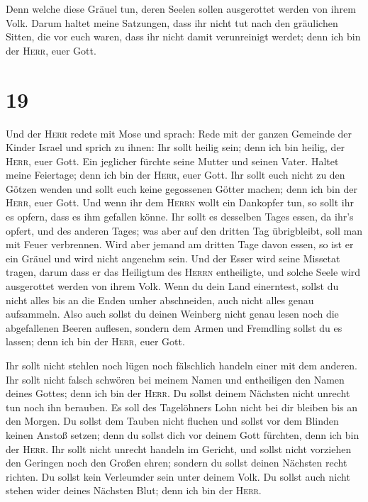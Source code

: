  Denn welche diese Gräuel tun, deren Seelen sollen
ausgerottet werden von ihrem Volk.  Darum haltet meine
Satzungen, dass ihr nicht tut nach den gräulichen Sitten, die vor euch
waren, dass ihr nicht damit verunreinigt werdet; denn ich bin der
\textsc{Herr}, euer Gott.

\hypertarget{section-18}{%
\section{19}\label{section-18}}

 Und der \textsc{Herr} redete mit Mose und sprach:
 Rede mit der ganzen Gemeinde der Kinder Israel und sprich
zu ihnen: Ihr sollt heilig sein; denn ich bin heilig, der \textsc{Herr},
euer Gott.  Ein jeglicher fürchte seine Mutter und seinen
Vater. Haltet meine Feiertage; denn ich bin der \textsc{Herr}, euer
Gott.  Ihr sollt euch nicht zu den Götzen wenden und sollt
euch keine gegossenen Götter machen; denn ich bin der \textsc{Herr},
euer Gott.  Und wenn ihr dem \textsc{Herrn} wollt ein
Dankopfer tun, so sollt ihr es opfern, dass es ihm gefallen könne.
 Ihr sollt es desselben Tages essen, da ihr's opfert, und
des anderen Tages; was aber auf den dritten Tag übrigbleibt, soll man
mit Feuer verbrennen.  Wird aber jemand am dritten Tage
davon essen, so ist er ein Gräuel und wird nicht angenehm sein.
 Und der Esser wird seine Missetat tragen, darum dass er
das Heiligtum des \textsc{Herrn} entheiligte, und solche Seele wird
ausgerottet werden von ihrem Volk.  Wenn du dein Land
einerntest, sollst du nicht alles bis an die Enden umher abschneiden,
auch nicht alles genau aufsammeln.  Also auch sollst du
deinen Weinberg nicht genau lesen noch die abgefallenen Beeren auflesen,
sondern dem Armen und Fremdling sollst du es lassen; denn ich bin der
\textsc{Herr}, euer Gott.

 Ihr sollt nicht stehlen noch lügen noch fälschlich
handeln einer mit dem anderen.  Ihr sollt nicht falsch
schwören bei meinem Namen und entheiligen den Namen deines Gottes; denn
ich bin der \textsc{Herr}.  Du sollst deinem Nächsten
nicht unrecht tun noch ihn berauben. Es soll des Tagelöhners Lohn nicht
bei dir bleiben bis an den Morgen.  Du sollst dem Tauben
nicht fluchen und sollst vor dem Blinden keinen Anstoß setzen; denn du
sollst dich vor deinem Gott fürchten, denn ich bin der \textsc{Herr}.
 Ihr sollt nicht unrecht handeln im Gericht, und sollst
nicht vorziehen den Geringen noch den Großen ehren; sondern du sollst
deinen Nächsten recht richten.  Du sollst kein Verleumder
sein unter deinem Volk. Du sollst auch nicht stehen wider deines
Nächsten Blut; denn ich bin der \textsc{Herr}.

